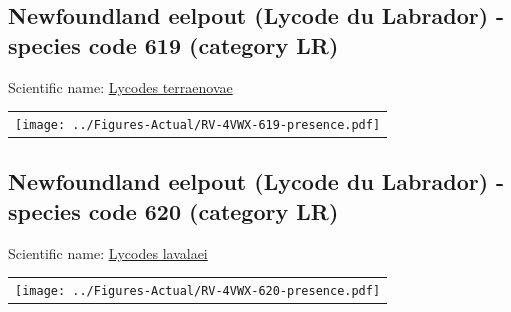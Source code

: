 \documentclass[12pt]{article}\usepackage[]{graphicx}\usepackage[]{color}
\begin{document}
\renewcommand\thefigure{\thesubsection\Alph{figure}}

\setcounter{figure}{0}

\hypertarget{sec:619}{%
\subsection{Newfoundland eelpout (Lycode du Labrador) - species code 619 (category LR)}\label{sec:619}}

  


Scientific name: \href{http://www.marinespecies.org/aphia.php?p=taxdetails\&id=127117}{Lycodes terraenovae} \newline
\begin{minipage}{1.0\textwidth}
 \begin{tabular}{c}
\texttt{[image: ../Figures-Actual/RV-4VWX-619-presence.pdf]} \\ 
\end{tabular} 
\end{minipage}
\clearpage

\renewcommand\thefigure{\thesubsection\Alph{figure}}

\setcounter{figure}{0}

\hypertarget{sec:620}{%
\subsection{Newfoundland eelpout (Lycode du Labrador) - species code 620 (category LR)}\label{sec:620}}

  


Scientific name: \href{http://www.marinespecies.org/aphia.php?p=taxdetails\&id=127107}{Lycodes lavalaei} \newline
\begin{minipage}{1.0\textwidth}
 \begin{tabular}{c}
\texttt{[image: ../Figures-Actual/RV-4VWX-620-presence.pdf]} \\ 
\end{tabular} 
\end{minipage}
\clearpage
\end{document}
